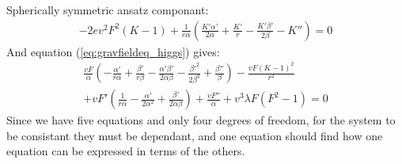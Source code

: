 \begin{subsection}{Spherically symmetric ansatz}
  componant:
  \begin{align}
    -2 e v^2 F^2 (K-1)+\frac{1}{e \alpha }\left(\frac{K' \alpha '}{2  \alpha }+\frac{K'}{r}-\frac{K' \beta '}{2 \beta }-K''\right)=0
  \end{align}
  And equation (\ref{eq:gravfieldeq_higgs}) gives:
  \begin{multline}
    \frac{v F}{\alpha} \left(-\frac{\alpha '}{r \alpha }+\frac{\beta '}{r  \beta }-\frac{\alpha ' \beta '}{2 \alpha  \beta }-\frac{\beta '^2}{2  \beta ^2}+\frac{\beta ''}{  \beta }\right)-\frac{v F \left(K-1\right)^2}{r^2}\\
    + v F' \left(\frac{1}{r \alpha }-\frac{\alpha '}{2 \alpha ^2}+\frac{\beta '}{2 \alpha  \beta }\right)+\frac{v F''}{\alpha }+v^3 \lambda  F \left(F^2-1\right)=0
  \end{multline}
Since we have five equations and only four degrees of freedom, for the
system to be consistant they must be dependant, and one equation
should find how one equation can be expressed in terms of the others.
\end{subsection}
